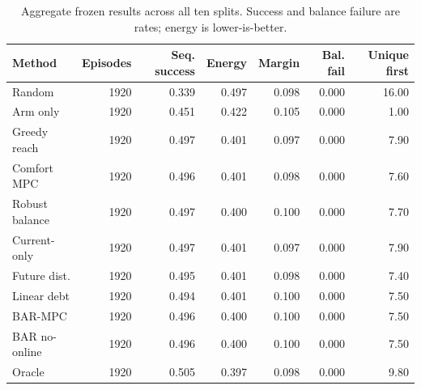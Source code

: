 \begin{table}[t]
\centering
\caption{Aggregate frozen results across all ten splits. Success and balance failure are rates; energy is lower-is-better.}
\label{tab:aggregate-main}
\small
\begin{tabular}{lrrrrrr}
\toprule
Method & Episodes & Seq. success & Energy & Margin & Bal. fail & Unique first \\
\midrule
Random & 1920 & 0.339 & 0.497 & 0.098 & 0.000 & 16.00 \\
Arm only & 1920 & 0.451 & 0.422 & 0.105 & 0.000 & 1.00 \\
Greedy reach & 1920 & 0.497 & 0.401 & 0.097 & 0.000 & 7.90 \\
Comfort MPC & 1920 & 0.496 & 0.401 & 0.098 & 0.000 & 7.60 \\
Robust balance & 1920 & 0.497 & 0.400 & 0.100 & 0.000 & 7.70 \\
Current-only & 1920 & 0.497 & 0.401 & 0.097 & 0.000 & 7.90 \\
Future dist. & 1920 & 0.495 & 0.401 & 0.098 & 0.000 & 7.40 \\
Linear debt & 1920 & 0.494 & 0.401 & 0.100 & 0.000 & 7.50 \\
BAR-MPC & 1920 & 0.496 & 0.400 & 0.100 & 0.000 & 7.50 \\
BAR no-online & 1920 & 0.496 & 0.400 & 0.100 & 0.000 & 7.50 \\
Oracle & 1920 & 0.505 & 0.397 & 0.098 & 0.000 & 9.80 \\
\bottomrule
\end{tabular}
\end{table}
